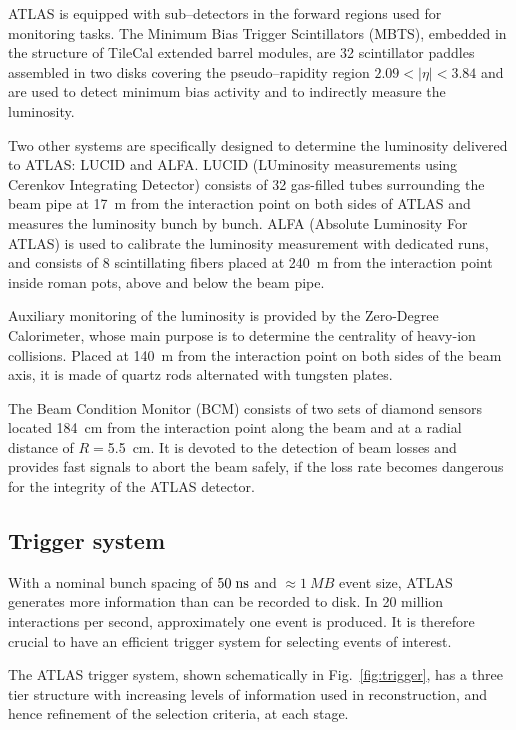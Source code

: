 ATLAS is equipped with sub--detectors in the forward regions used for
monitoring tasks.
The Minimum Bias Trigger Scintillators (MBTS), embedded in the
structure of TileCal extended barrel modules, are 32 scintillator
paddles assembled in two disks covering the pseudo--rapidity region
$2.09<|\eta|<3.84$ and are used to detect minimum bias activity and to
indirectly measure the luminosity.

Two other systems are specifically designed to determine the
luminosity delivered to ATLAS: LUCID and ALFA.
LUCID (LUminosity measurements using Cerenkov Integrating Detector)
consists of 32 gas-filled tubes surrounding the beam pipe at 17~m from
the interaction point on both sides of ATLAS and measures the
luminosity bunch by bunch. 
ALFA (Absolute Luminosity For ATLAS) is used to calibrate the
luminosity measurement with dedicated runs, and consists of 8
scintillating fibers placed at 240~m from the interaction point inside
roman pots, above and below the beam pipe.

Auxiliary monitoring of the luminosity is provided by the Zero-Degree
Calorimeter, whose main purpose is to determine the centrality of heavy-ion
collisions.
Placed at 140~m from the interaction point on both sides of the beam axis,
it is made of quartz rods alternated with tungsten plates.

The Beam Condition Monitor (BCM) consists of two sets of
diamond sensors located 184~cm from the interaction point along the
beam and at a radial distance of $R=$5.5~cm. 
It is devoted to the detection of beam losses and provides fast
signals to abort the beam safely, if the loss rate becomes dangerous
for the integrity of the ATLAS detector.

\subsection{Trigger system}
\label{sec:triggerDAQ}

With a nominal bunch spacing of \mbox{$50 \; \mathrm{ns}$} and
\mbox{$\approx{}1~MB$} event size, ATLAS generates more
information than can be recorded to disk. In 20 million 
interactions per second, approximately one \ttbar{} event 
is produced. It is therefore crucial to have an efficient trigger
system for selecting events of interest.

The ATLAS trigger system, shown schematically in
Fig.~\ref{fig:trigger}, has a three tier structure with increasing
levels of information used in reconstruction, and hence refinement of
the selection criteria, at each stage.


